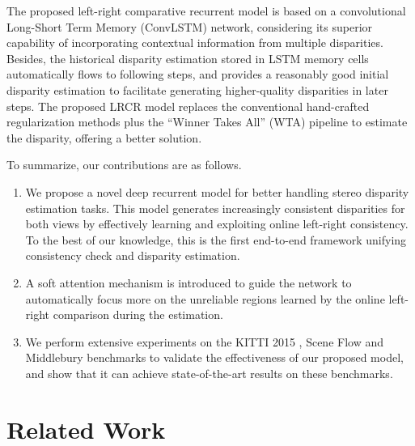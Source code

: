\documentclass[10pt,twocolumn,letterpaper]{article}
\begin{document}
The proposed left-right comparative recurrent model is based on a convolutional Long-Short Term Memory (ConvLSTM) network, considering its superior capability of  incorporating contextual information from multiple disparities. Besides, the historical disparity estimation stored in LSTM memory cells   automatically flows to following steps, and provides a reasonably good initial disparity estimation to facilitate  generating  higher-quality disparities in later steps. The proposed LRCR model replaces the conventional hand-crafted regularization methods \cite{scharstein2002taxonomy} plus the ``Winner Takes All'' (WTA) pipeline to estimate the disparity, offering a better solution.

To summarize, our contributions are as follows.
\begin{enumerate}
	\setlength\itemsep{0em}
	\vspace{-0.1cm}
	\item We propose a novel  deep recurrent model for better handling  stereo disparity estimation tasks. This model generates increasingly  consistent disparities for both views by effectively learning and exploiting online left-right consistency.  To the best of our knowledge, this is the first end-to-end framework unifying consistency check and disparity estimation. 
	\vspace{-0.1cm} 
	\item A soft attention mechanism is introduced to guide the network to automatically focus more on the  unreliable regions  learned by the online left-right comparison during the estimation.
	\vspace{-0.1cm} 
	\item We perform extensive experiments on the KITTI 2015 \cite{Menze2015CVPR, Menze2015ISA}, Scene Flow \cite{mayer2016large} and Middlebury \cite{scharstein2002middlebury} benchmarks to validate the effectiveness of our proposed model, and show that it can achieve state-of-the-art results on these benchmarks.
\end{enumerate}
\section{Related Work}

\end{document}
